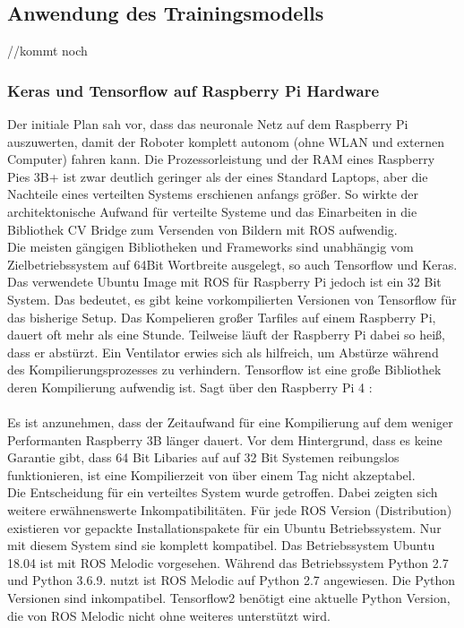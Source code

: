 \documentclass[conference]{IEEEtran}
\begin{document}
	
	\subsection{Anwendung des Trainingsmodells} %
	//kommt noch
	\subsubsection{Keras und Tensorflow auf Raspberry Pi Hardware}
	Der initiale Plan sah vor, dass das neuronale Netz auf dem Raspberry Pi auszuwerten, damit der Roboter komplett autonom (ohne WLAN und externen Computer) fahren kann. Die Prozessorleistung und der RAM eines Raspberry Pies 3B+ ist zwar deutlich geringer als der eines Standard Laptops, aber die Nachteile eines verteilten Systems erschienen anfangs größer. So wirkte der architektonische Aufwand für  verteilte Systeme und  das Einarbeiten in die Bibliothek CV Bridge zum Versenden von Bildern mit ROS aufwendig. \\
	Die meisten gängigen Bibliotheken und Frameworks sind unabhängig vom Zielbetriebssystem auf 64Bit Wortbreite ausgelegt, so auch Tensorflow und Keras.  Das verwendete Ubuntu Image mit ROS für Raspberry Pi jedoch ist ein 32 Bit System. Das bedeutet, es gibt keine vorkompilierten Versionen von Tensorflow für das bisherige Setup. Das Kompelieren großer Tarfiles auf einem Raspberry Pi, dauert oft mehr als eine Stunde. Teilweise läuft der Raspberry Pi dabei so heiß, dass er abstürzt. Ein Ventilator erwies sich als hilfreich, um  Abstürze während des Kompilierungsprozesses zu verhindern. Tensorflow ist eine große Bibliothek deren Kompilierung aufwendig ist. 
	Sagt über den Raspberry Pi 4   : \\
	 \\
	Es ist  anzunehmen, dass der Zeitaufwand für eine Kompilierung auf dem weniger Performanten Raspberry 3B länger dauert. Vor dem Hintergrund, dass es keine Garantie gibt, dass 64 Bit Libaries auf auf 32 Bit Systemen reibungslos funktionieren, ist eine Kompilierzeit von über einem Tag nicht akzeptabel. \\
	
	Die Entscheidung für ein verteiltes System wurde getroffen. Dabei zeigten sich weitere erwähnenswerte Inkompatibilitäten. Für jede ROS Version (Distribution) existieren vor gepackte Installationspakete für ein Ubuntu Betriebssystem. Nur mit diesem System sind sie komplett kompatibel. Das Betriebssystem Ubuntu 18.04 ist mit ROS Melodic vorgesehen. Während das Betriebssystem Python 2.7 und Python 3.6.9. nutzt ist ROS Melodic auf Python 2.7 angewiesen. Die Python Versionen sind inkompatibel. Tensorflow2 benötigt eine aktuelle Python Version, die von ROS Melodic nicht ohne weiteres unterstützt wird. \\
	
\end{document}
